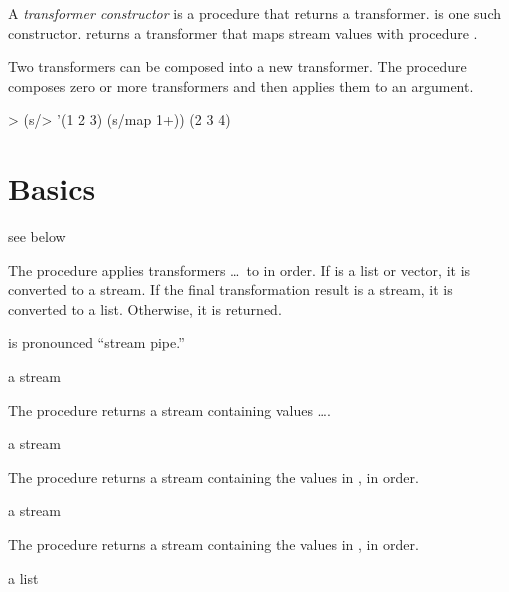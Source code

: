 A \emph{transformer constructor} is a procedure that returns a transformer. 
is one such constructor.  returns a transformer that maps stream values
with procedure .

Two transformers can be composed into a new transformer. The  procedure composes
zero or more transformers and then applies them to an argument.

\codebegin
> (s/> '(1 2 3) (s/map 1+))
(2 3 4)
\codeend

\section {Basics}

\begin{procedure}
\end{procedure}
\returns{} see below

The  procedure applies transformers  \ldots\ to  in order. If
 is a list or vector, it is converted to a stream. If the final transformation
result is a stream, it is converted to a list. Otherwise, it is returned.

 is pronounced ``stream pipe.''

\begin{procedure}
\end{procedure}
\returns{} a stream

The  procedure returns a stream containing values  \ldots.

\begin{procedure}
\end{procedure}
\returns{} a stream

The  procedure returns a stream containing the values in , in
order.

\begin{procedure}
\end{procedure}
\returns{} a stream

The  procedure returns a stream containing the values in
, in order.

\begin{procedure}
\end{procedure}
\returns{} a list


